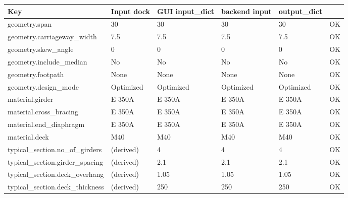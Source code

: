 \begin{tabular}{@{}llllll@{}}
\toprule
\textbf{Key} & \textbf{Input dock} & \textbf{GUI input\_dict} & \textbf{backend input} & \textbf{output\_dict} & \textbf{} \\
\midrule
geometry.span & 30 & 30 & 30 & 30 & OK \\
geometry.carriageway\_width & 7.5 & 7.5 & 7.5 & 7.5 & OK \\
geometry.skew\_angle & 0 & 0 & 0 & 0 & OK \\
geometry.include\_median & No & No & No & No & OK \\
geometry.footpath & None & None & None & None & OK \\
geometry.design\_mode & Optimized & Optimized & Optimized & Optimized & OK \\
material.girder & E 350A & E 350A & E 350A & E 350A & OK \\
material.cross\_bracing & E 350A & E 350A & E 350A & E 350A & OK \\
material.end\_diaphragm & E 350A & E 350A & E 350A & E 350A & OK \\
material.deck & M40 & M40 & M40 & M40 & OK \\
typical\_section.no\_of\_girders & (derived) & 4 & 4 & 4 & OK \\
typical\_section.girder\_spacing & (derived) & 2.1 & 2.1 & 2.1 & OK \\
typical\_section.deck\_overhang & (derived) & 1.05 & 1.05 & 1.05 & OK \\
typical\_section.deck\_thickness & (derived) & 250 & 250 & 250 & OK \\
\bottomrule
\end{tabular}
